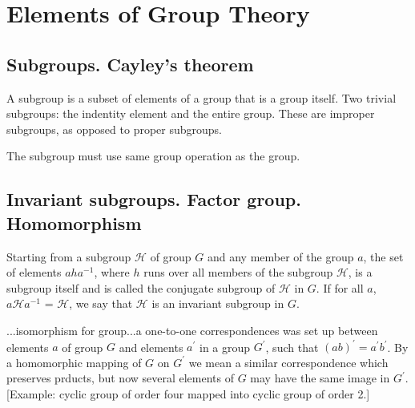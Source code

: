 \documentclass{book}
\begin{document}
\chapter{Elements of Group Theory}

\section{}
\section{}

\section{Subgroups. Cayley's theorem}

A subgroup is a subset of elements of a group that is a group itself. Two trivial subgroups: the indentity element and the entire group. These are improper subgroups, as opposed to proper subgroups.

The subgroup must use same group operation as the group.

\section{}
\section{}

\section{Invariant subgroups. Factor group. Homomorphism}

Starting from a subgroup $\mathcal H$ of group $G$ and any member of the group $a$, the set of elements $aha^{-1}$, where $h$ runs over all members of the subgroup $\mathcal H$, is a subgroup itself and is called the conjugate subgroup of $\mathcal H$ in $G$. If for all $a$, $a{\mathcal H} a^{-1}$ =  $\mathcal H$, we say that $\mathcal H$ is an invariant subgroup in $G$.

...isomorphism for group...a one-to-one correspondences was set up between elements $a$ of group $G$ and elements $a^\prime$ in a group $G^\prime$, such that $(ab)^\prime = a^\prime b^\prime$. By a homomorphic mapping of $G$ on $G^\prime$ we mean a similar correspondence which preserves prducts, but now several elements of $G$ may have the same image in $G^\prime$. [Example: cyclic group of order four mapped into cyclic group of order 2.]
\end{document}
